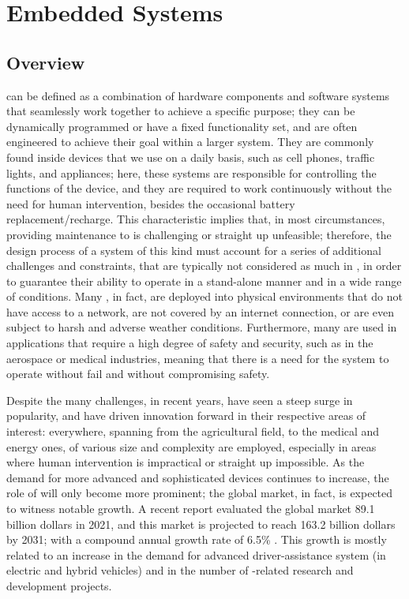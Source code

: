 \chapter{Embedded Systems}
\label{chap:3_es}
\section{Overview}
\ess can be defined as a combination of hardware components and software systems that seamlessly work together to achieve a specific purpose; they can be dynamically programmed or have a fixed functionality set, and are often engineered to achieve their goal within a larger system. They are commonly found inside devices that we use on a daily basis, such as cell phones, traffic lights, and appliances; here, these systems are responsible for controlling the functions of the device, and they are required to work continuously without the need for human intervention, besides the occasional battery replacement/recharge.
This characteristic implies that, in most circumstances, providing maintenance to \ess is challenging or straight up unfeasible; therefore, the design process of a system of this kind must account for a series of additional challenges and constraints, that are typically not considered as much in \noess, in order to guarantee their ability to operate in a stand-alone manner and in a wide range of conditions. Many \ess, in fact, are deployed into physical environments that do not have access to a network, are not covered by an internet connection, or are even subject to harsh and adverse weather conditions.
Furthermore, many \ess are used in applications that require a high degree of safety and security, such as in the aerospace or medical industries, meaning that there is a need for the system to operate without fail and without compromising safety. 

Despite the many challenges, in recent years, \ess have seen a steep surge in popularity, and have driven innovation forward in their respective areas of interest: everywhere, spanning from the agricultural field, to the medical and energy ones, \ess of various size and complexity are employed, especially in areas where human intervention is impractical or straight up impossible.
As the demand for more advanced and sophisticated devices continues to increase, the role of \ess will only become more prominent; the global \ess market, in fact, is expected to witness notable growth. A recent report evaluated the global \ess market 89.1 billion dollars in 2021, and this market is projected to reach 163.2 billion dollars by 2031; with a compound annual growth rate of  6.5\% \cite{ESSTR2022}. This growth is mostly related to  an increase in the demand for advanced driver-assistance system (in electric and hybrid vehicles) and in the number of \ess-related research and development projects. 





